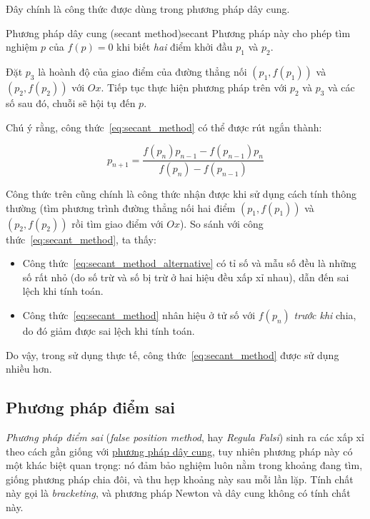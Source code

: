 \documentclass[../../Lectures]{subfiles}
\begin{document}
Đây chính là công thức được dùng trong phương pháp dây cung.

\begin{cmethod}{Phương pháp dây cung (secant method)}{secant}
    Phương pháp này cho phép tìm nghiệm \(p\) của \(f(p) = 0\) khi biết
    \emph{hai} điểm khởi đầu \(p_1\) và \(p_2\).

    Đặt \(p_3\) là hoành độ của giao điểm của đường thẳng nối \((p_1, f(p_1))\)
    và \((p_2, f(p_2))\) với \(Ox\). Tiếp tục thực hiện phương pháp trên với
    \(p_2\) và \(p_3\) và các số sau đó, chuỗi sẽ hội tụ đến \(p\).
\end{cmethod}

Chú ý rằng, công thức~\ref{eq:secant_method} có thể được rút ngắn thành:

\begin{equation}\label{eq:secant_method_alternative}
    p_{n + 1} = \frac{f(p_n) p_{n - 1} - f(p_{n - 1}) p_n}{f(p_n) - f(p_{n - 1})}
\end{equation}

Công thức trên cũng chính là công thức nhận được khi sử dụng cách tính thông
thường (tìm phương trình đường thẳng nối hai điểm \((p_1, f(p_1))\) và \((p_2,
f(p_2))\) rồi tìm giao điểm với \(Ox\)). So sánh với công
thức~\eqref{eq:secant_method}, ta thấy:

\begin{itemize}
    \item Công thức~\eqref{eq:secant_method_alternative} có tỉ số và
        mẫu số đều là những số rất nhỏ (do số trừ và số bị trừ ở hai hiệu đều
        xấp xỉ nhau), dẫn đến sai lệch khi tính toán.

    \item Công thức~\eqref{eq:secant_method} nhân hiệu ở tử số với \(f(p_n)\)
        \emph{trước khi} chia, do đó giảm được sai lệch khi tính toán.
\end{itemize}

Do vậy, trong sử dụng thực tế, công thức~\ref{eq:secant_method} được sử dụng
nhiều hơn.

\subsection{Phương pháp điểm sai}

\emph{Phương pháp điểm sai} (\emph{false position method}, hay \emph{Regula
Falsi}) sinh ra các xấp xỉ theo cách gần giống với
\hyperref[method:secant]{phương pháp dây cung}, tuy nhiên phương pháp này có một
khác biệt quan trọng: nó đảm bảo nghiệm luôn nằm trong khoảng đang tìm, giống
phương pháp chia đôi, và thu hẹp khoảng này sau mỗi lần lặp. Tính chất này gọi
là \emph{bracketing}, và phương pháp Newton và dây cung không có tính chất này.
\end{document}
